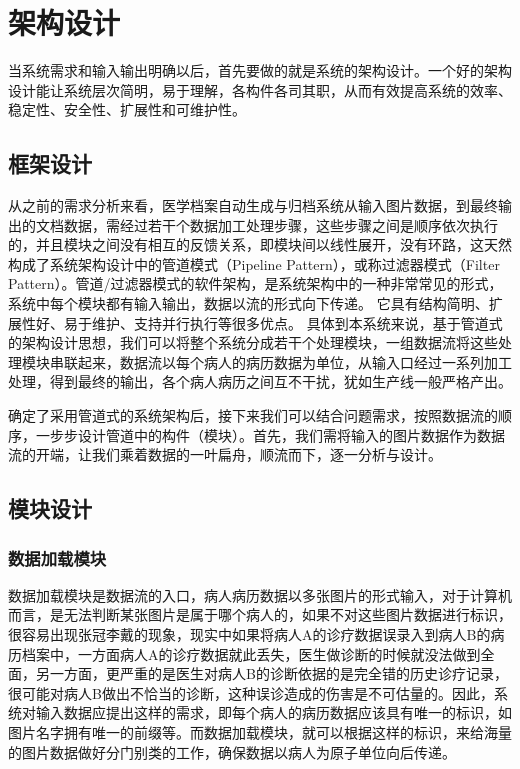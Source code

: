 \chapter{架构设计}
\label{chap:system-framework}
当系统需求和输入输出明确以后，首先要做的就是系统的架构设计。一个好的架构设计能让系统层次简明，易于理解，各构件各司其职，从而有效提高系统的效率、稳定性、安全性、扩展性和可维护性。

\section{框架设计}
从之前的需求分析来看，医学档案自动生成与归档系统从输入图片数据，到最终输出的文档数据，需经过若干个数据加工处理步骤，这些步骤之间是顺序依次执行的，并且模块之间没有相互的反馈关系，即模块间以线性展开，没有环路，这天然构成了系统架构设计中的管道模式（Pipeline Pattern）\citep{Vermeulen1995pipeline}，或称过滤器模式（Filter Pattern）。管道/过滤器模式的软件架构，是系统架构中的一种非常常见的形式，系统中每个模块都有输入输出，数据以流的形式向下传递。
它具有结构简明、扩展性好、易于维护、支持并行执行等很多优点。
具体到本系统来说，基于管道式的架构设计思想，我们可以将整个系统分成若干个处理模块，一组数据流将这些处理模块串联起来，数据流以每个病人的病历数据为单位，从输入口经过一系列加工处理，得到最终的输出，各个病人病历之间互不干扰，犹如生产线一般严格产出。

确定了采用管道式的系统架构后，接下来我们可以结合问题需求，按照数据流的顺序，一步步设计管道中的构件（模块）。首先，我们需将输入的图片数据作为数据流的开端，让我们乘着数据的一叶扁舟，顺流而下，逐一分析与设计。

\section{模块设计}
\subsection{数据加载模块} \label{ssec:dataLoader-design}
数据加载模块是数据流的入口，病人病历数据以多张图片的形式输入，对于计算机而言，是无法判断某张图片是属于哪个病人的，如果不对这些图片数据进行标识，很容易出现张冠李戴的现象，现实中如果将病人A的诊疗数据误录入到病人B的病历档案中，一方面病人A的诊疗数据就此丢失，医生做诊断的时候就没法做到全面，另一方面，更严重的是医生对病人B的诊断依据的是完全错的历史诊疗记录，很可能对病人B做出不恰当的诊断，这种误诊造成的伤害是不可估量的。因此，系统对输入数据应提出这样的需求，即每个病人的病历数据应该具有唯一的标识，如图片名字拥有唯一的前缀等。而数据加载模块，就可以根据这样的标识，来给海量的图片数据做好分门别类的工作，确保数据以病人为原子单位向后传递。

